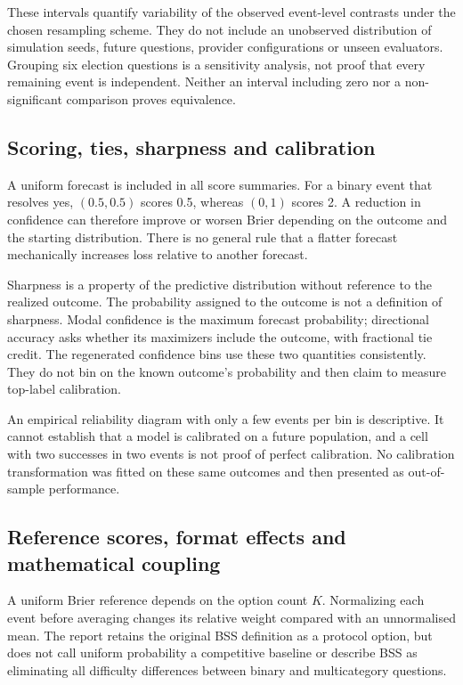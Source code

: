 These intervals quantify variability of the observed event-level contrasts under the chosen resampling scheme. They do not include an unobserved distribution of simulation seeds, future questions, provider configurations or unseen evaluators. Grouping six election questions is a sensitivity analysis, not proof that every remaining event is independent. Neither an interval including zero nor a non-significant comparison proves equivalence.

\subsection{Scoring, ties, sharpness and calibration}
A uniform forecast is included in all score summaries. For a binary event that resolves yes, $(0.5,0.5)$ scores 0.5, whereas $(0,1)$ scores 2. A reduction in confidence can therefore improve or worsen Brier depending on the outcome and the starting distribution. There is no general rule that a flatter forecast mechanically increases loss relative to another forecast.

Sharpness is a property of the predictive distribution without reference to the realized outcome. The probability assigned to the outcome is not a definition of sharpness. Modal confidence is the maximum forecast probability; directional accuracy asks whether its maximizers include the outcome, with fractional tie credit. The regenerated confidence bins use these two quantities consistently. They do not bin on the known outcome's probability and then claim to measure top-label calibration.

An empirical reliability diagram with only a few events per bin is descriptive. It cannot establish that a model is calibrated on a future population, and a cell with two successes in two events is not proof of perfect calibration. No calibration transformation was fitted on these same outcomes and then presented as out-of-sample performance.

\subsection{Reference scores, format effects and mathematical coupling}
A uniform Brier reference depends on the option count $K$. Normalizing each event before averaging changes its relative weight compared with an unnormalised mean. The report retains the original BSS definition as a protocol option, but does not call uniform probability a competitive baseline or describe BSS as eliminating all difficulty differences between binary and multicategory questions.

